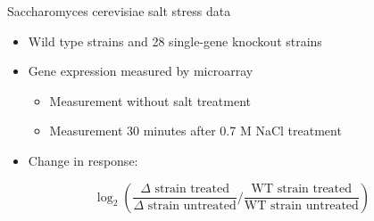 \documentclass[aspectratio=169]{beamer}
\begin{document}

\begin{frame}{Saccharomyces cerevisiae salt stress data}
\begin{itemize}
 \item Wild type strains and 28 single-gene knockout strains
 \item Gene expression measured by microarray
  \begin{itemize}
   \item \normalsize Measurement without salt treatment
   \item \normalsize Measurement 30 minutes after 0.7 M NaCl treatment
  \end{itemize}
 \item Change in response:
\end{itemize}
\[
 \log_2 \left( \frac{\Delta \text{ strain treated}}{\Delta \text{ strain untreated}} \bigg/ \frac{\text{WT strain treated}}{\text{WT strain untreated}} \right)
\]
\vfill
{\parencite{berry2008stress, lee2011dynamic} \\}
\end{frame}

\end{document}

